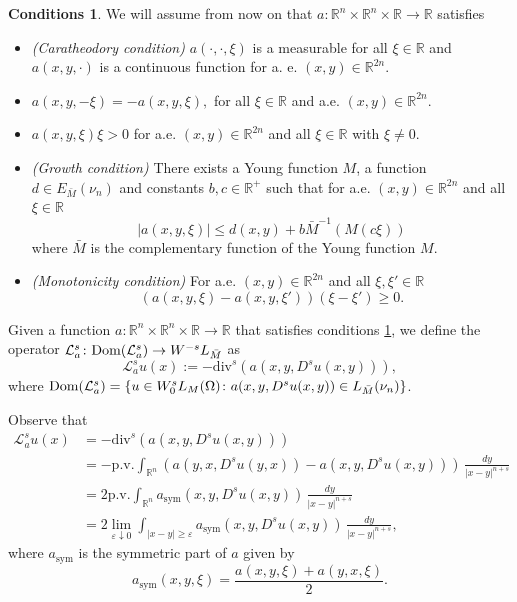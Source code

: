 \documentclass{amsart}
\def\Dom{\text{\normalfont Dom}}
\newcommand{\A}{\mathcal{L}_a^s}
\newcommand{\R}{{\mathbb R}}
\theoremstyle{remark}
\theoremstyle{definition}
\newtheorem{conditions}[teo]{Conditions}
\numberwithin{equation}{section}
\begin{document}
\begin{conditions}\label{condicionesa}
We will assume from now on that $a\colon \R^n\times\R^n\times \R\to \R$ satisfies
\begin{itemize}
\item{\em (Caratheodory condition)} $a(\cdot, \cdot, \xi)$ is a measurable for all $\xi\in\R$ and $a(x, y, \cdot)$ is a continuous function for a. e. $(x, y)\in \R^{2n}$.
\item $a(x,y,-\xi)=-a(x,y,\xi),$ for all $\xi\in\R$ and a.e. $(x, y)\in\R^{2n}$.
\item $a(x,y,\xi)\xi>0$ for a.e. $(x, y)\in\R^{2n}$ and all $\xi\in\R$ with $\xi\neq 0.$
\item {\em (Growth condition)} There exists a Young function $M$, a function $d\in E_{\bar{M}}(\nu_n)$ and constants $b,c\in \R^+$ such that  for a.e. $(x, y)\in \R^{2n}$ and all $\xi\in \R$
\begin{equation}\label{GC}
|a(x,y,\xi)|\leq d(x,y)+b\bar{M}^{-1}(M(c\xi))%
\end{equation} 
where $\bar{M}$ is the complementary function of the Young function $M$.
\item{\em (Monotonicity condition)} For a.e. $(x, y)\in \R^{2n}$ and all $\xi,\xi'\in\R$ 
\begin{equation}\label{MC}
(a(x,y,\xi)-a(x,y,\xi'))(\xi-\xi')\geq 0.
\end{equation}
\end{itemize}
\end{conditions}


Given a function $a\colon \R^n\times\R^n\times \R\to \R$ that satisfies conditions \ref{condicionesa}, we define the operator $\A\colon \Dom(\A)\to W^{-s}L_{\bar{M}}$ as	
$$
\A u(x):=-\mathrm{div}^s(a(x,y,D^su(x,y))),
$$
where $\Dom(\A)=\{u\in W_0^sL_M(\Omega)\colon a(x, y, D^su(x, y))\in L_{\bar{M}}(\nu_n)\}$.

Observe that
$$
\begin{aligned}
\A u(x) &= -\mathrm{div}^s(a(x,y,D^su(x,y)))
\\
&=-\text{p.v.}\int_{\R^n}(a(y,x,D^su(y,x))-a(x,y,D^su(x,y)))\,\frac{dy}{|x-y|^{n+s}}\\
&=2\text{p.v.}\int_{\R^n}a_{\text{sym}}(x,y,D^su(x,y))\,\frac{dy}{|x-y|^{n+s}}
\\
&= 2\lim_{\varepsilon\downarrow 0}\int_{|x-y|\geq \varepsilon}a_{\text{sym}}(x,y,D^su(x,y))\,\frac{dy}{|x-y|^{n+s}},
\end{aligned}
$$
where $a_{\text{sym}}$ is the symmetric part of $a$ given by
$$
a_{\text{sym}}(x,y,\xi)=\frac{a(x, y, \xi)+a(y, x, \xi)}{2}.
$$
\end{document}
